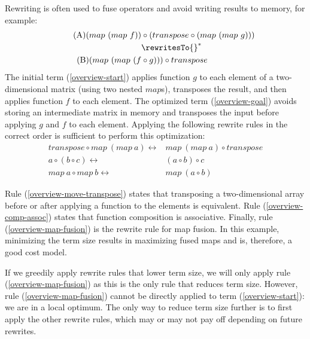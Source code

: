 Rewriting is often used to fuse operators and avoid writing results to memory, for example:
\begin{align*}
\tag{A} \label{overview-start}
(map~(map~f)) &\circ (transpose \circ (map~(map~g))) \\
&\rewritesTo{}^* \\
\tag{B} \label{overview-goal}
(map~(map~(f &\circ g))) \circ transpose \\
\end{align*}
The initial term (\ref{overview-start}) applies function $g$ to each element of a two-dimensional matrix (using two nested $map$s), transposes the result, and then applies function $f$ to each element.
The optimized term (\ref{overview-goal}) avoids storing an intermediate matrix in memory and transposes the input before applying $g$ and $f$ to each element.
Applying the following rewrite rules in the correct order is sufficient to perform this optimization:
\begin{align}
\label{overview-move-transpose}
transpose \circ map~(map~a) \longleftrightarrow{}& map~(map~a) \circ transpose\\
\label{overview-comp-assoc}
a \circ (b \circ c) \longleftrightarrow{}& (a \circ b) \circ c\\
\label{overview-map-fusion}
map~a \circ map~b \longleftrightarrow{}& map~(a \circ b)
\end{align}

Rule (\ref{overview-move-transpose}) states that transposing a two-dimensional array before or after applying a function to the elements is equivalent.
Rule (\ref{overview-comp-assoc}) states that function composition is associative.
Finally, rule (\ref{overview-map-fusion}) is the rewrite rule for map fusion.
In this example, minimizing the term size results in maximizing fused maps and is, therefore, a good cost model. %

If we greedily apply rewrite rules that lower term size, we will only apply rule (\ref{overview-map-fusion}) as this is the only rule that reduces term size.
However, rule (\ref{overview-map-fusion}) cannot be directly applied to term (\ref{overview-start}): we are in a local optimum.
The only way to reduce term size further is to first apply the other rewrite rules, which may or may not pay off depending on future rewrites.

